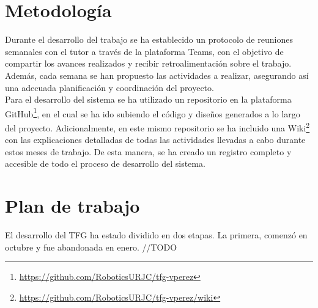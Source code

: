 \section{Metodología}
\label{sec:metodologia}

Durante el desarrollo del trabajo se ha establecido un protocolo de reuniones semanales con el tutor a 
través de la plataforma Teams, con el objetivo de compartir los avances realizados y recibir retroalimentación 
sobre el trabajo. Además, cada semana se han propuesto las actividades a realizar, asegurando así una adecuada 
planificación y coordinación del proyecto. \\
Para el desarrollo del sistema se ha utilizado un repositorio en la plataforma GitHub\footnote{\url{https://github.com/RoboticsURJC/tfg-vperez}}, en el cual se ha ido
subiendo el código y diseños generados a lo largo del proyecto. Adicionalmente, en este mismo repositorio 
se ha incluido una Wiki\footnote{\url{https://github.com/RoboticsURJC/tfg-vperez/wiki}} con las explicaciones detalladas de todas las actividades llevadas a cabo durante estos 
meses de trabajo. De esta manera, se ha creado un registro completo y accesible de todo el proceso de desarrollo del sistema.

\section{Plan de trabajo}
\label{sec:plantrabajo}
El desarrollo del TFG ha estado dividido en dos etapas. La primera, comenzó en octubre y fue abandonada en enero. 
//TODO

